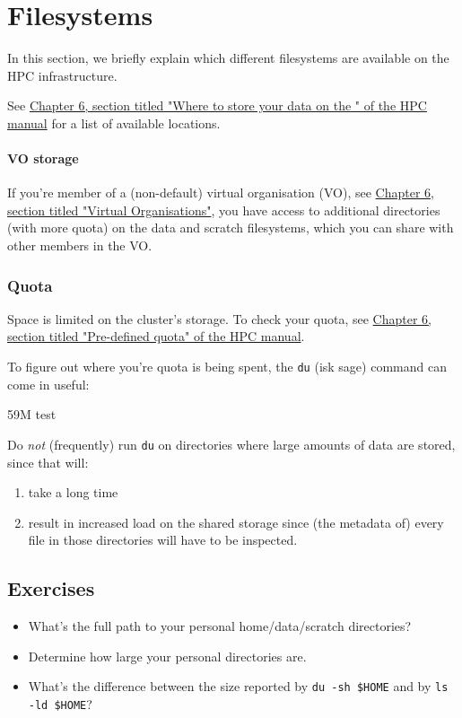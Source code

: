\chapter{Filesystems}

In this section, we briefly explain which different filesystems are available on
the \gls{HPC} infrastructure.

See \href{\HPCManualURL#predefined-user-directories}{Chapter 6, section titled "Where to store your data on the \hpc{}" of the HPC manual}
for a list of available locations.

\ifgent

\subsubsection{VO storage}

If you're member of a (non-default) virtual organisation (VO), see
\href{\HPCManualURL#sec:virtual-organisation}{Chapter 6, section titled "Virtual Organisations"}, you have access to
additional directories (with more quota) on the data and \gls{scratch} filesystems,
which you can share with other members in the VO.

\fi

\subsection{Quota}

Space is limited on the cluster's storage. To check your quota, see
\href{\HPCManualURL#predefined-quotas}{Chapter 6, section titled "Pre-defined quota" of the HPC manual}.

To figure out where you're quota is being spent, the \lstinline|du| (isk sage)
command can come in useful:

\begin{prompt}
59M   test
\end{prompt}

Do \emph{not} (frequently) run \lstinline|du| on directories where large amounts
of data are stored, since that will:
\begin{enumerate}
    \item take a long time
    \item result in increased
        load on the shared storage since (the metadata of) every file in those directories
        will have to be inspected.
\end{enumerate}

\section{Exercises}

\begin{itemize}
    \item What's the full path to your personal home/data/scratch directories?
    \item Determine how large your personal directories are.
    \item What's the difference between the size reported by \lstinline|du -sh $HOME|
        and by \lstinline|ls -ld $HOME|?
\end{itemize}
